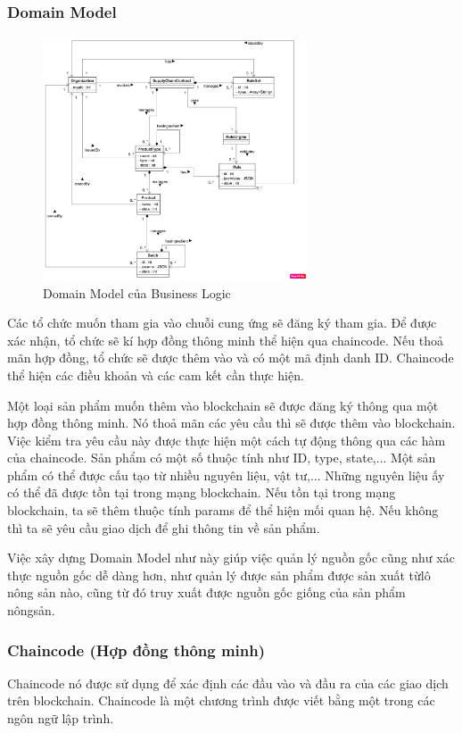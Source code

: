 \subsubsection{Domain Model}

\begin{figure}[h]
    \centering
    \includegraphics[width=0.7\textwidth]{images/domain_model.png}
    \caption{Domain Model của Business Logic} 
\end{figure}

Các tổ chức muốn tham gia vào chuỗi cung ứng sẽ đăng ký tham gia. Để được xác nhận, 
tổ chức sẽ kí hợp đồng thông minh thể hiện qua chaincode. Nếu thoả mãn hợp đồng, 
tổ chức sẽ được thêm vào và có một mã định danh ID. Chaincode thể hiện các điều khoản
và các cam kết cần thực hiện. 

Một loại sản phẩm muốn thêm vào blockchain sẽ được đăng ký thông qua một hợp đồng 
thông minh. Nó thoả mãn các yêu cầu thì sẽ được thêm vào blockchain. Việc kiểm tra 
yêu cầu này được thực hiện một cách tự động thông qua các hàm của chaincode. Sản phẩm có một 
số thuộc tính như ID, type, state,...
Một sản phẩm có thể được cấu tạo từ nhiều nguyên liệu, vật tư,... Những nguyên liệu ấy
có thể đã được tồn tại trong mạng blockchain. Nếu tồn tại trong mạng blockchain, ta sẽ thêm 
thuộc tính params để thể hiện mối quan hệ. Nếu không thì ta sẽ yêu cầu giao dịch
để ghi thông tin về sản phẩm. 

Việc xây dựng Domain Model như này giúp việc quản lý nguồn gốc cũng như xác thực nguồn gốc 
dễ dàng hơn, như quản lý được sản phẩm được sản xuất từlô nông sản nào, cũng từ đó truy xuất được nguồn gốc giống của sản phẩm nôngsản.
\subsubsection{Chaincode (Hợp đồng thông minh)}
Chaincode nó được sử dụng để xác định các đầu vào và đầu ra của các giao dịch trên blockchain. Chaincode là một chương trình được 
viết bằng một trong các ngôn ngữ lập trình.

